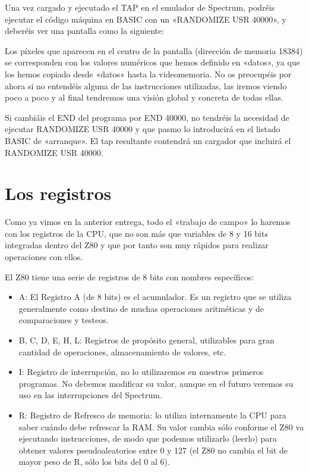 \documentclass[letterpaper,10pt,spanish]{sphinxmanual}
\begin{document}
Una vez cargado y ejecutado el TAP en el emulador de Spectrum, podréis ejecutar el código máquina en BASIC con un «RANDOMIZE USR 40000», y deberéis ver una pantalla como la siguiente:

\begin{figure}[htbp]
\centering

\noindent{}
\end{figure}

Los píxeles que aparecen en el centro de la pantalla (dirección de memoria 18384) se corresponden con los valores numéricos que hemos definido en «datos», ya que los hemos copiado desde «datos» hasta la videomemoria. No os preocupéis por ahora si no entendéis alguna de las instrucciones utilizadas, las iremos viendo poco a poco y al final tendremos una visión global y concreta de todas ellas.

Si cambiáis el END del programa por END 40000, no tendréis la necesidad de ejecutar RANDOMIZE USR 40000 y que pasmo lo introducirá en el listado BASIC de «arranque». El tap resultante contendrá un cargador que incluirá el RANDOMIZE USR 40000.


\section{Los registros}
\label{\detokenize{04_lenguaje_ensamblador_01/lenguaje_ensamblador_01:los-registros}}
Como ya vimos en la anterior entrega, todo el «trabajo de campo» lo haremos con los registros de la CPU, que no son más que variables de 8 y 16 bits integradas dentro del Z80 y que por tanto son muy rápidos para realizar operaciones con ellos.

El Z80 tiene una serie de registros de 8 bits con nombres específicos:
\begin{itemize}
\item {} 
A: El Registro A (de 8 bits) es el acumulador. Es un registro que se utiliza generalmente como destino de muchas operaciones aritméticas y de comparaciones y testeos.

\item {} 
B, C, D, E, H, L: Registros de propósito general, utilizables para gran cantidad de operaciones, almacenamiento de valores, etc.

\item {} 
I: Registro de interrupción, no lo utilizaremos en nuestros primeros programas. No debemos modificar su valor, aunque en el futuro veremos su uso en las interrupciones del Spectrum.

\item {} 
R: Registro de Refresco de memoria: lo utiliza internamente la CPU para saber cuándo debe refrescar la RAM. Su valor cambia sólo conforme el Z80 va ejecutando instrucciones, de modo que podemos utilizarlo (leerlo) para obtener valores pseudo\sphinxhyphen{}aleatorios entre 0 y 127 (el Z80 no cambia el bit de mayor peso de R, sólo los bits del 0 al 6).

\end{itemize}
\end{document}

